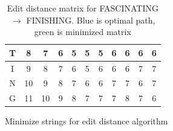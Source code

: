 \begin{table}
\begin{center}
\begin{tabular}[c]{c|c|c|c|c|c|c|c|c|c|c|}
			T & 8                    & \cellcolor{green!25}7 & \cellcolor{green!25}6 & \cellcolor{green!25}5 & \cellcolor{green!25}5 & \cellcolor{green!25}5 & \cellcolor{blue!25}6  & 6                    & 6                    & 6                    \\\hline
			I & 9                    & 8                     & 7                     & 6                     & 5                     & 6                     & 6                     & \cellcolor{blue!25}6 & 7                    & 7                    \\\hline
			N & 10                   & 9                     & 8                     & 7                     & 6                     & 6                     & 7                     & 7                    & \cellcolor{blue!25}6 & 7                    \\\hline
			G & 11                   & 10                    & 9                     & 8                     & 7                     & 7                     & 7                     & 8                    & 7                    & \cellcolor{blue!25}6 \\\hline \end{tabular} \end{center} \caption{Edit distance matrix for FASCINATING $\rightarrow$ FINISHING. Blue
		is optimal path, green is minimized matrix}
	\label{tab:minimizededitmatrix}
\end{table}

\begin{algorithm}[htp]
  \SetAlgoLined\DontPrintSemicolon

  \vspace{0.5cm}
  \caption{Minimize strings for edit distance algorithm}
  \label{alg:minimizededitstrings}
\end{algorithm}

